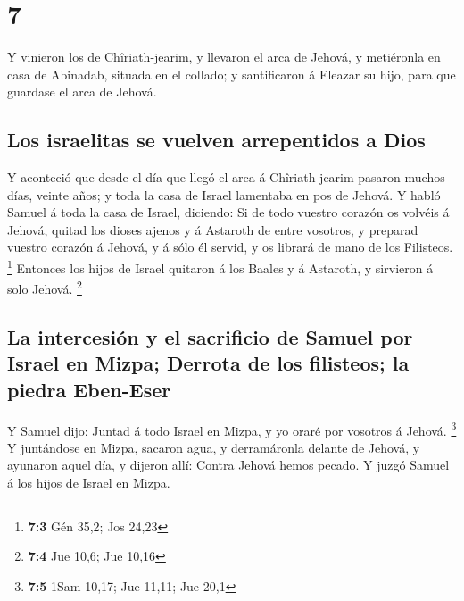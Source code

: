 \hypertarget{section-6}{%
\section{7}\label{section-6}}

 Y vinieron los de Chîriath-jearim, y llevaron el arca de
Jehová, y metiéronla en casa de Abinadab, situada en el collado; y
santificaron á Eleazar su hijo, para que guardase el arca de Jehová.

\hypertarget{los-israelitas-se-vuelven-arrepentidos-a-dios}{%
\subsection{Los israelitas se vuelven arrepentidos a
Dios}\label{los-israelitas-se-vuelven-arrepentidos-a-dios}}

 Y aconteció que desde el día que llegó el arca á
Chîriath-jearim pasaron muchos días, veinte años; y toda la casa de
Israel lamentaba en pos de Jehová.  Y habló Samuel á toda
la casa de Israel, diciendo: Si de todo vuestro corazón os volvéis á
Jehová, quitad los dioses ajenos y á Astaroth de entre vosotros, y
preparad vuestro corazón á Jehová, y á sólo él servid, y os librará de
mano de los Filisteos. \footnote{\textbf{7:3} Gén 35,2; Jos 24,23}
 Entonces los hijos de Israel quitaron á los Baales y á
Astaroth, y sirvieron á solo Jehová. \footnote{\textbf{7:4} Jue 10,6;
  Jue 10,16}

\hypertarget{la-intercesiuxf3n-y-el-sacrificio-de-samuel-por-israel-en-mizpa-derrota-de-los-filisteos-la-piedra-eben-eser}{%
\subsection{La intercesión y el sacrificio de Samuel por Israel en
Mizpa; Derrota de los filisteos; la piedra
Eben-Eser}\label{la-intercesiuxf3n-y-el-sacrificio-de-samuel-por-israel-en-mizpa-derrota-de-los-filisteos-la-piedra-eben-eser}}

 Y Samuel dijo: Juntad á todo Israel en Mizpa, y yo oraré
por vosotros á Jehová. \footnote{\textbf{7:5} 1Sam 10,17; Jue 11,11; Jue
  20,1}  Y juntándose en Mizpa, sacaron agua, y
derramáronla delante de Jehová, y ayunaron aquel día, y dijeron allí:
Contra Jehová hemos pecado. Y juzgó Samuel á los hijos de Israel en
Mizpa.

